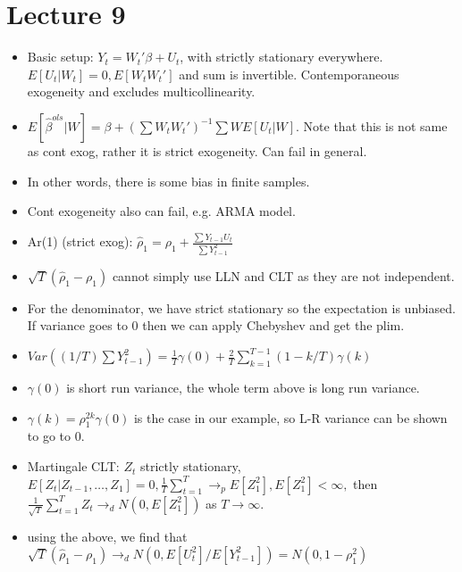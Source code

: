 \documentclass[11pt]{article} %
\begin{document}
\section{Lecture 9}
\begin{itemize}
\item Basic setup: $Y_t = W_t'\beta + U_t$, with strictly stationary everywhere. $E[U_t|W_t] = 0,E[W_tW_t']$ and sum is invertible. Contemporaneous exogeneity and excludes multicollinearity. 
\item $E[\hat{\beta}^{ols}|W] = \beta + (\sum W_t W_t')^{-1}\sum WE[U_t|W]$. Note that this is not same as cont exog, rather it is strict exogeneity. Can fail in general.
\item In other words, there is some bias in finite samples. 
\item Cont exogeneity also can fail, e.g. ARMA model.
\item Ar(1) (strict exog): $\hat{\rho}_1 = \rho_1 + \frac{\sum Y_{t-1}U_t}{\sum Y_{t-1}^2}$
\item $\sqrt{T}(\hat{\rho}_1 - \rho_1)$ cannot simply use LLN and CLT as they are not independent.
\item For the denominator, we have strict stationary so the expectation is unbiased. If variance goes to 0 then we can apply Chebyshev and get the plim.
\item $Var((1/T)\sum Y_{t-1}^2) = \frac{1}{T}\gamma(0) + \frac{2}{T}\sum_{k=1}^{T-1}(1-k/T)\gamma(k)$
\item $\gamma(0)$ is short run variance, the whole term above is long run variance.
\item $\gamma(k) = \rho_1^{2k}\gamma(0)$ is the case in our example, so L-R variance can be shown to go to 0.
\item Martingale CLT: $Z_t$ strictly stationary, $E[Z_t|Z_{t-1},\dots,Z_{1}] = 0, \frac{1}{T}\sum_{t=1}^{T}\rightarrow_p E[Z_1^2], E[Z_1^2]<\infty,$ then $\frac{1}{\sqrt{T}}\sum_{t=1}^T Z_t \rightarrow_d N(0,E[Z_1^2])$ as $T\rightarrow\infty.$
\item using the above, we find that $\sqrt{T}(\hat{\rho}_1 - \rho_1)\rightarrow_d N(0,E[U_t^2]/E[Y^2_{t-1}]) =N(0,1-\rho_1^2)$
\end{itemize}
\end{document}
